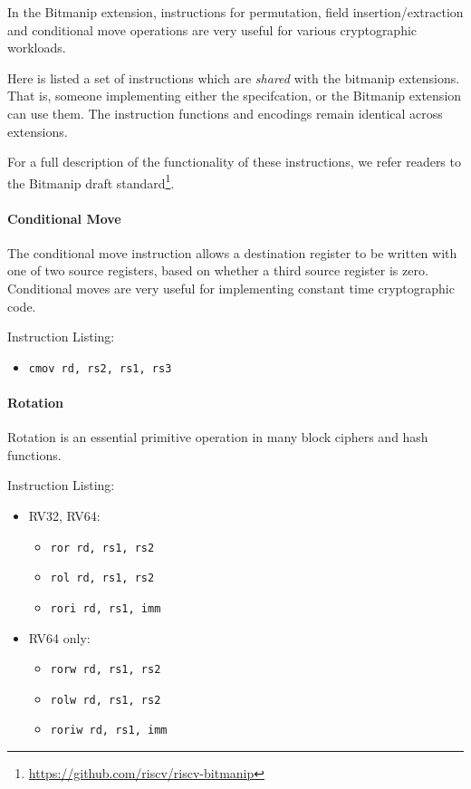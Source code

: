 In the Bitmanip extension, instructions for permutation, field
insertion/extraction and conditional move operations are very
useful for various cryptographic workloads.

Here is listed a set of instructions which are {\em shared} with
the bitmanip extensions.
That is, someone implementing either the \XCRYPTO specifcation, or
the Bitmanip extension can use them.
The instruction functions and encodings remain identical across extensions.

For a full description of the functionality of these instructions, we
refer readers to the Bitmanip draft standard\footnote{
\url{https://github.com/riscv/riscv-bitmanip}
}.

\paragraph{Conditional Move}
The conditional move instruction allows a destination register to
be written with one of two source registers, based on whether a
third source register is zero.
Conditional moves are very useful for implementing constant time
cryptographic code.

Instruction Listing:
\begin{itemize}
\item {\tt cmov rd, rs2, rs1, rs3}
\end{itemize}

\paragraph{Rotation}
Rotation is an essential primitive operation in many block ciphers and
hash functions.

Instruction Listing:
\begin{itemize}
\item RV32, RV64:
\begin{itemize}
\item {\tt ror  rd, rs1, rs2}
\item {\tt rol  rd, rs1, rs2}
\item {\tt rori rd, rs1, imm}
\end{itemize}
\item RV64 only:
\begin{itemize}
\item {\tt rorw  rd, rs1, rs2}
\item {\tt rolw  rd, rs1, rs2}
\item {\tt roriw rd, rs1, imm}
\end{itemize}
\end{itemize}

